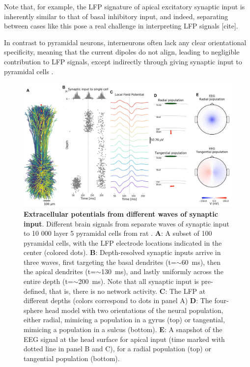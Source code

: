 \documentclass[preprint,11pt,authoryear]{elsarticle}
\begin{document}
Note that, for example, the LFP signature of apical excitatory synaptic input is inherently similar to that of basal inhibitory input, and indeed, separating between cases like this pose a real challenge in interpreting LFP signals [cite]. 

In contrast to pyramidal neurons, interneurons often lack any clear orientational specificity, meaning that the current dipoles do not align, leading to negligible contribution to LFP signals, except indirectly through giving synaptic input to pyramidal cells \citep{Hagen2016, Telenczuk2016}.

\begin{figure}[!ht]
\begin{center}
\includegraphics[width=1\textwidth]{population_EEG_MEG.png}
\end{center}
\caption{\textbf{Extracellular potentials from different waves of synaptic input}. Different brain signals from separate waves of synaptic input to 10 000 layer 5 pyramidal cells from rat \citep{Hay2011}.
{\bf A}: A subset of 100 pyramidal cells, with the LFP electrode locations indicated in the center (colored dots).
{\bf B}: Depth-resolved synaptic inputs arrive in three waves, first targeting the basal dendrites (t=$\sim$60~ms), then the apical dendrites (t=$\sim$130~ms), and lastly uniformly across the entire depth (t=$\sim$200~ms). Note that all synaptic input is pre-defined, that is, there is no network activity.
{\bf C}: The LFP at different depths (colors correspond to dots in panel A)
{\bf D}: The four-sphere head model with two orientations of the neural population, either radial, mimicing a population in a gyrus (top) or tangential, mimicing a population in a sulcus (bottom).
{\bf E}: A snapshot of the EEG signal at the head surface for apical input (time marked with dotted line in panel B and C), for a radial population (top) or tangential population (bottom).
}
\label{fig:LFP_EEG}
\end{figure}
\end{document}
